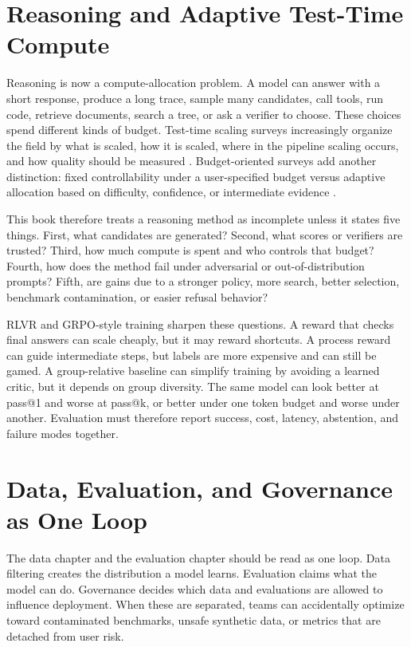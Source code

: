 \section{Reasoning and Adaptive Test-Time Compute}
\label{sec:adaptive-test-time-compute}

Reasoning is now a compute-allocation problem. A model can answer with a short response, produce a long trace, sample many candidates, call tools, run code, retrieve documents, search a tree, or ask a verifier to choose. These choices spend different kinds of budget. Test-time scaling surveys increasingly organize the field by what is scaled, how it is scaled, where in the pipeline scaling occurs, and how quality should be measured \cite{zhang2025testtimescaling}. Budget-oriented surveys add another distinction: fixed controllability under a user-specified budget versus adaptive allocation based on difficulty, confidence, or intermediate evidence \cite{alomrani2025budget}.

This book therefore treats a reasoning method as incomplete unless it states five things. First, what candidates are generated? Second, what scores or verifiers are trusted? Third, how much compute is spent and who controls that budget? Fourth, how does the method fail under adversarial or out-of-distribution prompts? Fifth, are gains due to a stronger policy, more search, better selection, benchmark contamination, or easier refusal behavior?

RLVR and GRPO-style training sharpen these questions. A reward that checks final answers can scale cheaply, but it may reward shortcuts. A process reward can guide intermediate steps, but labels are more expensive and can still be gamed. A group-relative baseline can simplify training by avoiding a learned critic, but it depends on group diversity. The same model can look better at pass@1 and worse at pass@k, or better under one token budget and worse under another. Evaluation must therefore report success, cost, latency, abstention, and failure modes together.

\section{Data, Evaluation, and Governance as One Loop}
\label{sec:data-evaluation-governance-loop}

The data chapter and the evaluation chapter should be read as one loop. Data filtering creates the distribution a model learns. Evaluation claims what the model can do. Governance decides which data and evaluations are allowed to influence deployment. When these are separated, teams can accidentally optimize toward contaminated benchmarks, unsafe synthetic data, or metrics that are detached from user risk.

